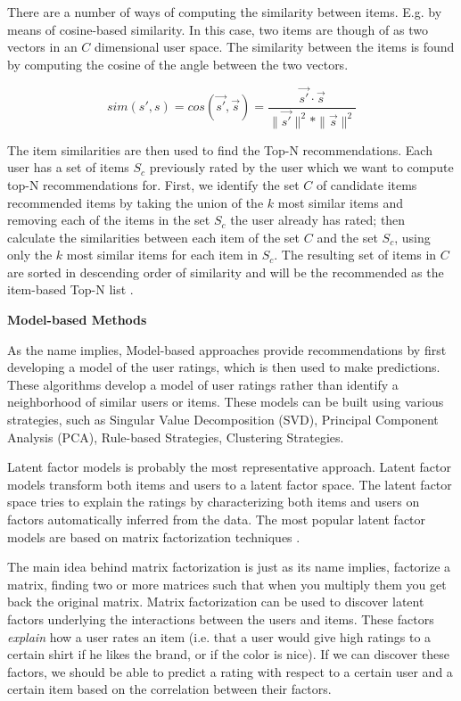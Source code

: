 There are a number of ways of computing the similarity between items. E.g. by means of cosine-based similarity. In this case, two items are though of as two vectors in an $C$ dimensional user space. The similarity between the items is found by computing the cosine of the angle between the two vectors.

\begin{equation}
sim(s',s) = cos(\vec{s'},\vec{s}) = \frac{\vec{s'} \cdot \vec{s}}{\|\vec{s'}\|^{2} * \|\vec{s}\|^{2}}
\end{equation}

The item similarities are then used to find the Top-N recommendations. Each user has a set of items $S_{c}$ previously rated by the user which we want to compute top-N recommendations for. First, we identify the set $C$ of candidate items recommended items by taking the union of the $k$ most similar items and removing each of the items in the set $S_{c}$ the user already has rated; then calculate the similarities between each item of the set $C$ and the set $S_{c}$, using only the $k$ most similar items for each item in $S_{c}$. The resulting set of items in $C$ are sorted in descending order of similarity and will be the recommended as the item-based Top-N list \cite{Karypis2001}.\newline

\textbf{Model-based Methods}

As the name implies, Model-based approaches provide recommendations by first developing a model of the user ratings, which is then used to make predictions. These algorithms develop a model of user ratings rather than identify a neighborhood of similar users or items. These models can be built using various strategies, such as Singular Value Decomposition (SVD), Principal Component Analysis (PCA), Rule-based Strategies, Clustering Strategies.

Latent factor models is probably the most representative approach. Latent factor models transform both items and users to a latent factor space. The latent factor space tries to explain the ratings by characterizing both items and users on factors automatically inferred from the data. The most popular latent factor models are based on matrix factorization techniques \cite{Koren2009}.

The main idea behind matrix factorization is just as its name implies, factorize a matrix, finding two or more matrices such that when you multiply them you get back the original matrix. Matrix factorization can be used to discover latent factors underlying the interactions between the users and items. These factors \emph{explain} how a user rates an item (i.e. that a user would give high ratings to a certain shirt if he likes the brand, or if the color is nice). If we can discover these factors, we should be able to predict a rating with respect to a certain user and a certain item based on the correlation between their factors.


